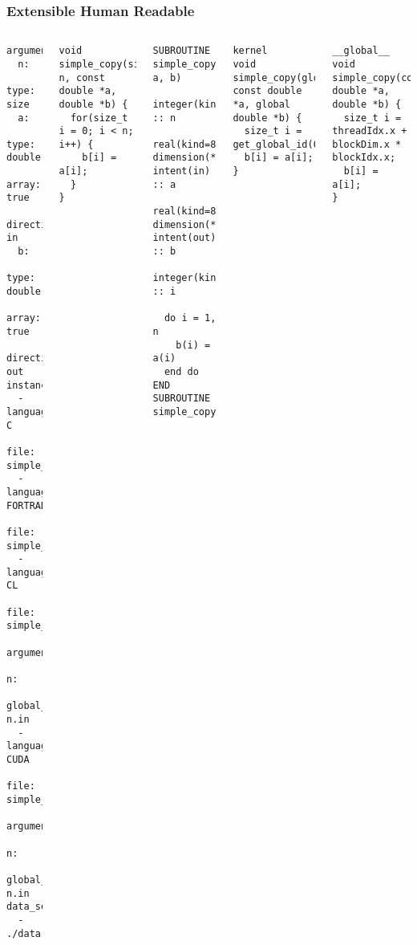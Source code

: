 \documentclass{beamer}
\begin{document}
\begin{frame}[fragile]
\frametitle{Extensible Human Readable}

  \begin{columns}
  \begin{verbatim}
arguments:
  n:
    type: size
  a:
    type: double
    array: true
    direction: in
  b:
    type: double
    array: true
    direction: out
instances:
  - language: C
    file: simple_copy.c
  - language: FORTRAN
    file: simple_copy.f
  - language: CL
    file: simple_copy.cl
    arguments:
      n:
    global_work_size: n.in
  - language: CUDA
    file: simple_copy.cu
    arguments:
      n:
    global_work_size: n.in
data_sets:
  - ./data
  \end{verbatim}
  \begin{verbatim}
void simple_copy(size_t n, const double *a, double *b) {
  for(size_t i = 0; i < n; i++) {
    b[i] = a[i];
  }
}
  \end{verbatim}
  \begin{verbatim}
SUBROUTINE simple_copy(n, a, b)
  integer(kind=8) :: n
  real(kind=8), dimension(*), intent(in) :: a
  real(kind=8), dimension(*), intent(out) :: b
  integer(kind=8) :: i
  
  do i = 1, n
    b(i) = a(i)
  end do
END SUBROUTINE simple_copy
  \end{verbatim}
  \begin{verbatim}
kernel
void simple_copy(global const double *a, global double *b) {
  size_t i = get_global_id(0);
  b[i] = a[i];
}
  \end{verbatim}
  \begin{verbatim}
__global__ void simple_copy(const double *a, double *b) {
  size_t i = threadIdx.x + blockDim.x * blockIdx.x;
  b[i] = a[i];
}
  \end{verbatim}
     
  \end{columns}
\end{frame}
\end{document}

